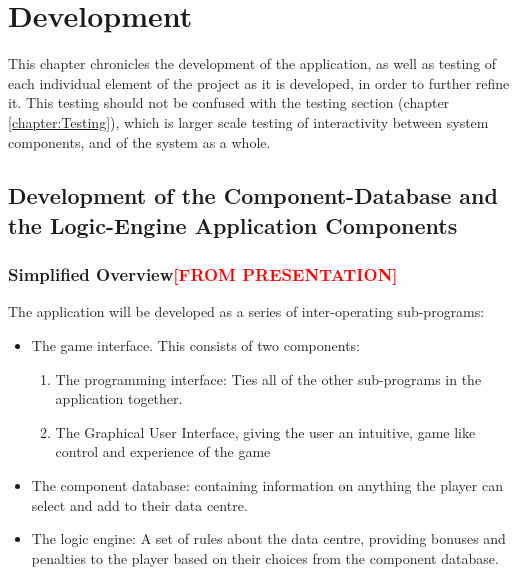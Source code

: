 \def\baselinestretch{1}

\chapter{Development}
\label{chapter:Development}

\def\baselinestretch{1.66}



This chapter chronicles the development of the application, as well as testing of each individual element of the project as it is developed, in order to further refine it. This testing should not be confused with the testing section (chapter \ref{chapter:Testing}), which is larger scale testing of interactivity between system components, and of the system as a whole.

\goodbreak

\section{Development of the Component-Database and the Logic-Engine Application Components}
\label{sec:DevelopmentOfTheComponentDatabaseAndTheLogicEngineApplicationComponents}


\subsection{Simplified Overview\textcolor{red}{[FROM PRESENTATION]}}
\label{sec:Methodology:SimplifiedOverview}
The application will be developed as a series of inter-operating sub-programs:

\begin{itemize}
\item The game interface.
    This consists of two components:
\begin{enumerate}
\item The programming interface: Ties all of the other sub-programs in the application together.

\item The Graphical User Interface, giving the user an intuitive, game like control and experience of the game
\end{enumerate}
\item The component database: containing information on anything the player can select and add to their data centre. 

\item The logic engine: A set of rules about the data centre, providing bonuses and penalties to the player based on their choices from the component database.
\end{itemize}

